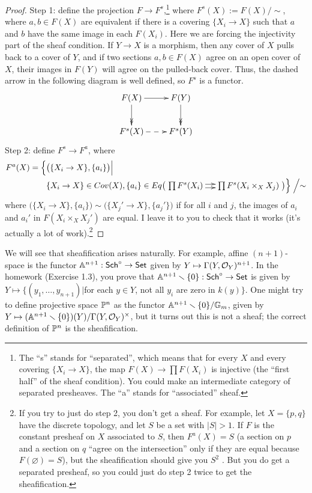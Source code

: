 \begin{proof}
 Step 1: define the projection $F\to F^s$,\footnote{The ``s'' stands for ``separated'', which means that for every $X$ and every covering $\{X_i\to X\}$, the map $F(X)\to \prod F(X_i)$ is injective (the ``first half'' of the sheaf condition). You could make an intermediate category of separated presheaves. The ``a'' stands for ``associated'' sheaf.} where $F^s(X):=F(X)/\sim$, where $a,b\in F(X)$ are equivalent if there is a covering $\{X_i\to X\}$ such that $a$ and $b$ have the same image in each $F(X_i)$. Here we are forcing the injectivity part of the sheaf condition. If $Y\to X$ is a morphism, then any cover of $X$ pulls back to a cover of $Y$, and if two sections $a,b\in F(X)$ agree on an open cover of $X$, their images in $F(Y)$ will agree on the pulled-back cover. Thus, the dashed arrow in the following diagram is well defined, so $F^s$ is a functor.
 \[\xymatrix{
  F(X)\ar[r] \ar@{->>}[d] & F(Y)\ar@{->>}[d]\\
  F^s(X) \ar@{-->}[r] & F^s(Y)
 }\]
 Step 2: define $F^s\to F^a$, where
 \begin{align*}
  F^a(X)=\Bigl\{&\bigl(\{X_i\to X\}, \{a_i\}\bigl)\Bigm| \\
  &\{X_i\to X\}\in Cov(X), \{a_i\}\in
  Eq\bigl(\xymatrix@-1pc{ \prod F^s(X_i)\ar@<.5ex>[r] \ar@<-.5ex>[r] & \prod F^s(X_i\times_X
  X_j)}\bigl)\Bigr\}\Bigm/\sim
 \end{align*}
 where $\bigl(\{X_i\to X\},\{a_i\}\bigr)\sim \bigl(\{X_j'\to X\},\{a_j'\}\bigr)$ if for all $i$ and $j$, the images of $a_i$ and $a_i'$ in $F(X_i\times_X X_j')$ are equal. I leave it to you to check that it works (it's actually a lot of work).\footnote{If you try to just do step 2, you don't get a sheaf. For example, let $X=\{p,q\}$ have the discrete topology, and let $S$ be a set with $|S|>1$. If $F$ is the constant presheaf on $X$ associated to $S$, then $F^a(X)=S$ (a section on $p$ and a section on $q$ ``agree on the intersection'' only if they are equal because $F(\varnothing)=S$), but the sheafification should give you $S^2$ . But you do get a separated presheaf, so you could just do step 2 twice to get the sheafification.}
\end{proof}
We will see that sheafification arises naturally. For example, affine $(n+1)$-space is the functor $\mathbb{A}^{n+1}:\text{\sf Sch}^\circ\to \text{\sf Set}$ given by $Y\mapsto \Gamma(Y,\mathcal{O}_Y)^{n+1}$. In the homework (Exercise 1.3), you prove that $\mathbb{A}^{n+1}\smallsetminus \{0\}:\text{\sf Sch}^\circ\to \text{\sf Set}$ is given by $Y\mapsto\{(y_1,\dots, y_{n+1})|$for each $y\in Y$, not all $y_i$ are zero in $k(y)\}$. One might try to define projective space $\mathbb{P}^n$ as the functor $\mathbb{A}^{n+1}\smallsetminus\{0\}/\mathbb{G}_m$, given by $Y\mapsto (\mathbb{A}^{n+1}\smallsetminus \{0\})(Y)/\Gamma(Y,\mathcal{O}_Y)^\times$, but it turns out this is not a sheaf; the correct definition of $\mathbb{P}^n$ is the sheafification.

